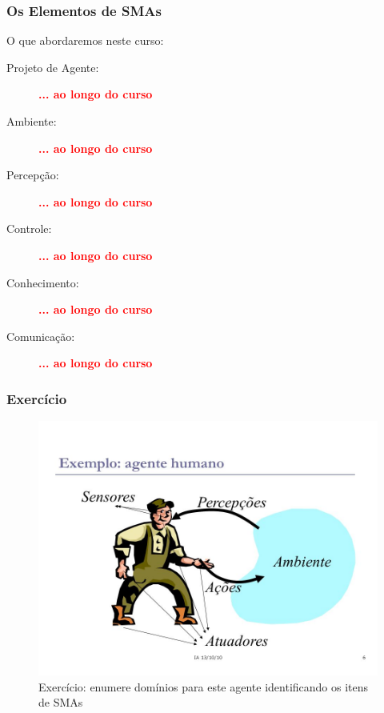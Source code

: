 \begin{frame}%

 \frametitle{Os Elementos de SMAs}
  
  \begin{block}{O que abordaremos neste curso:}
  
   \begin{description}
  
     \item[Projeto de Agente:] \textbf{\textcolor{red}{... ao longo do curso}}
     
    \item[Ambiente:] \textbf{\textcolor{red}{... ao longo do curso}}
          
   \item[Percepção:] \textbf{\textcolor{red}{... ao longo do curso}}
               
 \item[Controle:] \textbf{\textcolor{red}{... ao longo do curso}}
                    
  \item[Conhecimento:] \textbf{\textcolor{red}{... ao longo do curso}}
                          
  \item[Comunicação:] \textbf{\textcolor{red}{... ao longo do curso}}
          
   \end{description}
  \end{block}    
   
\end{frame}



\begin{frame}

\frametitle{Exercício}
   
\begin{figure}[!ht]
\centering
\includegraphics[height =.6\textheight,width=.7\textwidth]{figuras/agente_humano.jpg}
\caption{Exercício: enumere domínios para este agente identificando os itens de SMAs}
\end{figure}

   
\end{frame}



